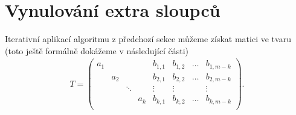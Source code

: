 \section{Vynulování extra sloupců}
Iterativní aplikací algoritmu z předchozí sekce můžeme získat matici ve tvaru
(toto ještě formálně dokážeme v následující části)
\begin{align} \label{extra_cols}
T =
    \left(
    \begin{array}{cccc|cccc}
        a_1 &     &        &     & b_{1,1} & b_{1,2} & \hdots & b_{1,m-k} \\
            & a_2 &        &     & b_{2,1} & b_{2,2} & \hdots & b_{2,m-k} \\
            &     & \ddots &     & \vdots  & \vdots  &        & \vdots    \\
            &     &        & a_k & b_{k,1} & b_{k,2} & \hdots & b_{k,m-k} \\
    \end{array}
    \right).
\end{align}

